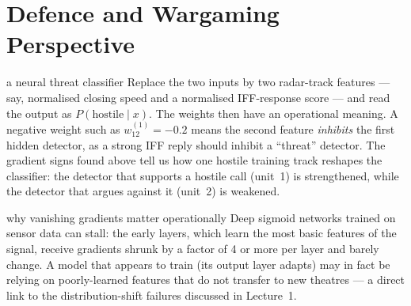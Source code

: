 \documentclass[11pt]{article}
\begin{document}
\section{Defence and Wargaming Perspective}
\begin{defence}{a neural threat classifier}
Replace the two inputs by two radar-track features --- say, normalised closing speed and a normalised IFF-response score --- and read the output as $P(\text{hostile}\mid x)$. The weights then have an operational meaning. A negative weight such as $w^{(1)}_{12}=-0.2$ means the second feature \emph{inhibits} the first hidden detector, as a strong IFF reply should inhibit a ``threat'' detector. The gradient signs found above tell us how one hostile training track reshapes the classifier: the detector that supports a hostile call (unit~1) is strengthened, while the detector that argues against it (unit~2) is weakened.
\end{defence}
\begin{defence}{why vanishing gradients matter operationally}
Deep sigmoid networks trained on sensor data can stall: the early layers, which learn the most basic features of the signal, receive gradients shrunk by a factor of 4 or more per layer and barely change. A model that appears to train (its output layer adapts) may in fact be relying on poorly-learned features that do not transfer to new theatres --- a direct link to the distribution-shift failures discussed in Lecture~1.
\end{defence}
\end{document}
